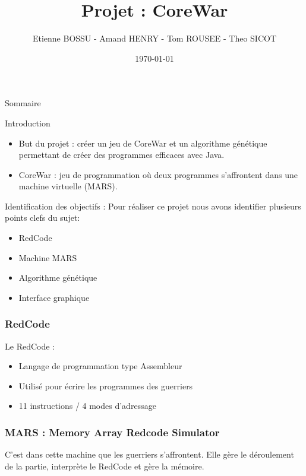 \documentclass{beamer}
\title{Projet : CoreWar}
\author{Etienne BOSSU - Amand HENRY - Tom ROUSEE - Theo SICOT}
\date{\today}
\begin{document}
\begin{frame}
    \titlepage
\end{frame}

\begin{frame}{Sommaire}
    \tableofcontents
\end{frame}

\begin{frame}{Introduction}
    \begin{itemize}
        \item But du projet : créer un jeu de CoreWar et un algorithme génétique permettant de créer des programmes efficaces avec Java.
        \vspace{\baselineskip}
        \item CoreWar : jeu de programmation où deux programmes s'affrontent dans une machine virtuelle (MARS).
    \end{itemize}
\end{frame}

\begin{frame}{Identification des objectifs :}
    Pour réaliser ce projet nous avons identifier plusieurs points clefs  du sujet:
    \vspace{\baselineskip}
    \begin{itemize}
        \item RedCode
        \item Machine MARS
        \item Algorithme génétique
        \item Interface graphique
    \end{itemize}
\end{frame}

\begin{frame}
    \frametitle{RedCode}
    Le RedCode :
    \begin{itemize}
        \item Langage de programmation type Assembleur
        \item Utilisé pour écrire les programmes des guerriers
        \item 11 instructions / 4 modes d'adressage
    \end{itemize}
\end{frame}

\begin{frame}
    \frametitle{MARS : Memory Array Redcode Simulator}
    C'est dans cette machine que les guerriers s'affrontent. Elle gère le déroulement de la partie, interprète le RedCode et gère la mémoire.
\end{frame}
\end{document}
